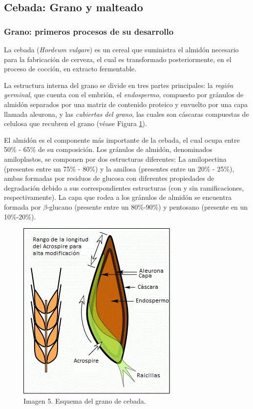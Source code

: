         
    	
        \subsection{Cebada: Grano y malteado}
            \subsubsection{Grano: primeros procesos de su desarrollo}
                \par La cebada (\textit{Hordeum vulgare}) es un cereal que suministra el almidón necesario para la fabricación de cerveza, el cual es transformado posteriormente, en el proceso de cocción, en extracto fermentable.
                \par La estructura interna del grano se divide en tres partes principales: la \textit{región germinal}, que cuenta con el embrión, el \textit{endospermo}, compuesto por gránulos de almidón separados por una matriz de contenido proteico y envuelto por una capa llamada aleurona, y las \textit{cubiertas del grano}, las cuales son cáscaras compuestas de celulosa que recubren el grano (véase Figura \ref{EstructuraGrano}).
        
                \par El almidón es el componente más importante de la cebada, el cual ocupa entre 50\% - 65\% de su composición. Los gránulos de almidón, denominados amiloplastos, se componen por dos estructuras diferentes: La amilopectina (presentes entre un 75\% - 80\%) y la amilosa (presentes entre un 20\% - 25\%), ambas formadas por residuos de glucosa con diferentes propiedades de degradación debido a sus correspondientes estructuras (con y sin ramificaciones, respectivamente). La capa que rodea a los gránulos de almidón se encuentra formada por $\beta$-glucano (presente entre un 80\%-90\%) y pentosano (presente en un 10\%-20\%).
        
                \begin{figure} [hb]
		            \centerline{\includegraphics[scale=0.9]{estructura_de_grano.jpg}}
		            \caption{ Imagen 5. Esquema del grano de cebada. \cite{Palmer}  }
	                \label{EstructuraGrano}
    	        \end{figure}
    	
